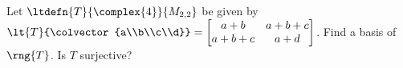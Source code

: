 Let $\ltdefn{T}{\complex{4}}{ M_{2,2}}$ be given by 
$\lt{T}{\colvector{a\\b\\c\\d}} = \begin{bmatrix} a + b & a + b + c\\ a + b + c & a + d\end{bmatrix}$. 
 Find a basis of $\rng{T}$.  
Is $T$ surjective?  
%